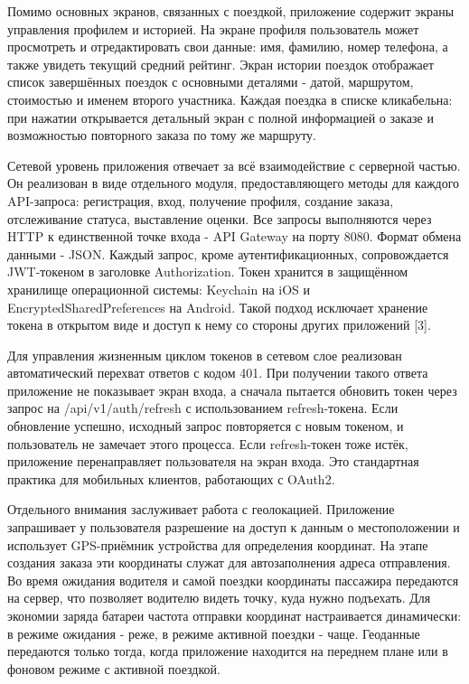 {\par \redline Помимо основных экранов, связанных с поездкой, приложение содержит экраны управления профилем и историей. На экране профиля пользователь может просмотреть и отредактировать свои данные: имя, фамилию, номер телефона, а также увидеть текущий средний рейтинг. Экран истории поездок отображает список завершённых поездок с основными деталями - датой, маршрутом, стоимостью и именем второго участника. Каждая поездка в списке кликабельна: при нажатии открывается детальный экран с полной информацией о заказе и возможностью повторного заказа по тому же маршруту.

\par \redline Сетевой уровень приложения отвечает за всё взаимодействие с серверной частью. Он реализован в виде отдельного модуля, предоставляющего методы для каждого API-запроса: регистрация, вход, получение профиля, создание заказа, отслеживание статуса, выставление оценки. Все запросы выполняются через HTTP к единственной точке входа - API Gateway на порту 8080. Формат обмена данными - JSON. Каждый запрос, кроме аутентификационных, сопровождается JWT-токеном в заголовке Authorization. Токен хранится в защищённом хранилище операционной системы: Keychain на iOS и \\EncryptedSharedPreferences на Android. Такой подход исключает хранение токена в открытом виде и доступ к нему со стороны других приложений [3].

\par \redline Для управления жизненным циклом токенов в сетевом слое реализован автоматический перехват ответов с кодом 401. При получении такого ответа приложение не показывает экран входа, а сначала пытается обновить токен через запрос на /api/v1/auth/refresh с использованием refresh-токена. Если обновление успешно, исходный запрос повторяется с новым токеном, и пользователь не замечает этого процесса. Если refresh-токен тоже истёк, приложение перенаправляет пользователя на экран входа. Это стандартная практика для мобильных клиентов, работающих с OAuth2.

\par \redline Отдельного внимания заслуживает работа с геолокацией. Приложение запрашивает у пользователя разрешение на доступ к данным о местоположении и использует GPS-приёмник устройства для определения координат. На этапе создания заказа эти координаты служат для автозаполнения адреса отправления. Во время ожидания водителя и самой поездки координаты пассажира передаются на сервер, что позволяет водителю видеть точку, куда нужно подъехать. Для экономии заряда батареи частота отправки координат настраивается динамически: в режиме ожидания - реже, в режиме активной поездки - чаще. Геоданные передаются только тогда, когда приложение находится на переднем плане или в фоновом режиме с активной поездкой.

}
